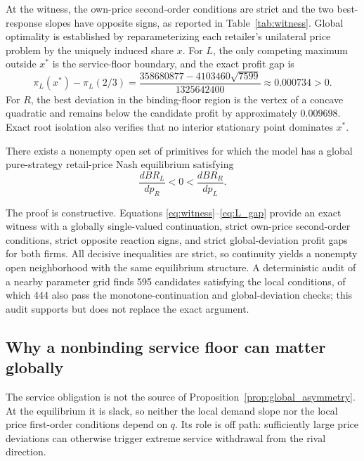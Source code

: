 

At the witness, the own-price second-order conditions are strict and the two best-response slopes have opposite signs, as reported in Table~\ref{tab:witness}. Global optimality is established by reparameterizing each retailer's unilateral price problem by the uniquely induced share $x$. For $L$, the only competing maximum outside $x^*$ is the service-floor boundary, and the exact profit gap is
\begin{equation}
\pi_L(x^*)-\pi_L(2/3)
=\frac{358680877-4103460\sqrt{7599}}{1325642400}
\approx0.000734>0.
\label{eq:L_gap}
\end{equation}
For $R$, the best deviation in the binding-floor region is the vertex of a concave quadratic and remains below the candidate profit by approximately $0.009698$. Exact root isolation also verifies that no interior stationary point dominates $x^*$.

\begin{proposition}\label{prop:global_asymmetry}
There exists a nonempty open set of primitives for which the model has a global pure-strategy retail-price Nash equilibrium satisfying
\begin{equation}
\frac{dBR_L}{dp_R}<0<\frac{dBR_R}{dp_L}.
\end{equation}
\end{proposition}

\noindent
The proof is constructive. Equations \eqref{eq:witness}--\eqref{eq:L_gap} provide an exact witness with a globally single-valued continuation, strict own-price second-order conditions, strict opposite reaction signs, and strict global-deviation profit gaps for both firms. All decisive inequalities are strict, so continuity yields a nonempty open neighborhood with the same equilibrium structure. A deterministic audit of a nearby parameter grid finds 595 candidates satisfying the local conditions, of which 444 also pass the monotone-continuation and global-deviation checks; this audit supports but does not replace the exact argument.

\subsection{Why a nonbinding service floor can matter globally}

The service obligation is not the source of Proposition~\ref{prop:global_asymmetry}. At the equilibrium it is slack, so neither the local demand slope nor the local price first-order conditions depend on $q$. Its role is off path: sufficiently large price deviations can otherwise trigger extreme service withdrawal from the rival direction.

